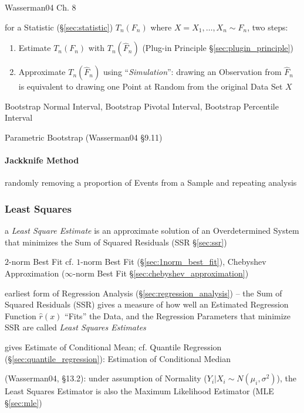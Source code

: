 Wasserman04 Ch. 8

for a Statistic (\S\ref{sec:statistic}) $T_n(F_n)$ where
$X = X_1, \ldots, X_n \sim F_n$, two steps:
\begin{enumerate}
  \item Estimate $T_n(F_n)$ with $T_n(\hat{F}_n)$ (Plug-in Principle
    \S\ref{sec:plugin_principle})
  \item Approximate $T_n(\hat{F}_n)$ using ``\emph{Simulation}'': drawing an
    Observation from $\hat{F}_n$ is equivalent to drawing one Point at Random
    from the original Data Set $X$
\end{enumerate}

Bootstrap Normal Interval, Bootstrap Pivotal Interval, Bootstrap Percentile
Interval

Parametric Bootstrap (Wasserman04 \S9.11)



\paragraph{Jackknife Method}\label{sec:jackknife_method}\hfill

randomly removing a proportion of Events from a Sample and repeating analysis



\subsubsection{Least Squares}\label{sec:least_squares}

a \emph{Least Square Estimate} is an approximate solution of an Overdetermined
System that minimizes the Sum of Squared Residuals (SSR \S\ref{sec:ssr})

$2$-norm Best Fit \fist cf. $1$-norm Best Fit (\S\ref{sec:1norm_best_fit}),
Chebyshev Approximation ($\infty$-norm Best Fit
\S\ref{sec:chebyshev_approximation})

earliest form of Regression Analysis (\S\ref{sec:regression_analysis})
-- the Sum of Squared Residuals (SSR) gives a measure of how well
an Estimated Regression Function $\hat{r}(x)$ ``Fits'' the Data, and the
Regression Parameters that minimize SSR are called \emph{Least Squares
  Estimates}

gives Estimate of Conditional Mean; cf. Quantile Regression
(\S\ref{sec:quantile_regression}): Estimation of Conditional Median

(Wasserman04, \S13.2):
 under assumption of Normality ($Y_i | X_i \sim N(\mu_i, \sigma^2)$), the Least
 Squares Estimator is also the Maximum Likelihood Estimator (MLE
 \S\ref{sec:mle})


